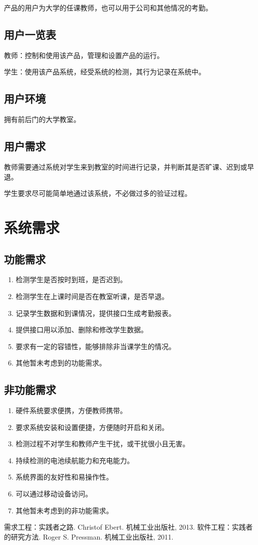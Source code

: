 \documentclass[cs4size,a4paper,nofonts]{ctexart}
\begin{document}
产品的用户为大学的任课教师，也可以用于公司和其他情况的考勤。

\subsection{用户一览表}

教师：控制和使用该产品，管理和设置产品的运行。

学生：使用该产品系统，经受系统的检测，其行为记录在系统中。

\subsection{用户环境}

拥有前后门的大学教室。

\subsection{用户需求}

教师需要通过系统对学生来到教室的时间进行记录，并判断其是否旷课、迟到或早退。

学生要求尽可能简单地通过该系统，不必做过多的验证过程。

\section{系统需求}

\subsection{功能需求}

\begin{enumerate}
\item 检测学生是否按时到班，是否迟到。
\item 检测学生在上课时间是否在教室听课，是否早退。
\item 记录学生数据和到课情况，提供接口生成考勤报表。
\item 提供接口用以添加、删除和修改学生数据。
\item 要求有一定的容错性，能够排除非当课学生的情况。
\item 其他暂未考虑到的功能需求。
\end{enumerate}

\subsection{非功能需求}

\begin{enumerate}
\item 硬件系统要求便携，方便教师携带。
\item 要求系统安装和设置便捷，方便随时开启和关闭。
\item 检测过程不对学生和教师产生干扰，或干扰很小且无害。
\item 持续检测的电池续航能力和充电能力。
\item 系统界面的友好性和易操作性。
\item 可以通过移动设备访问。
\item 其他暂未考虑到的非功能需求。
\end{enumerate}

\begin{thebibliography}{10}
 需求工程：实践者之路. Christof Ebert. 机械工业出版社, 2013.
 软件工程：实践者的研究方法. Roger S. Pressman. 机械工业出版社, 2011.
\end{thebibliography}
\end{document}
